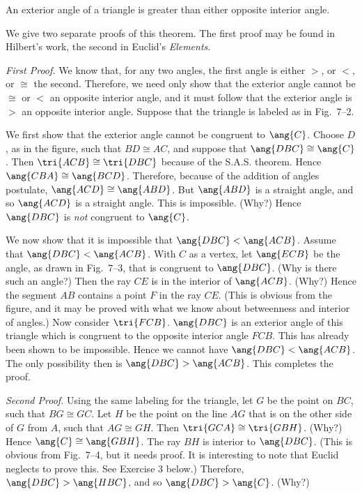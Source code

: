 \documentclass[11pt]{book}
\theoremstyle{bkplain}
\theoremstyle{XIplainnote}
\theoremstyle{bkplain}
\theoremstyle{bkplain}
\begin{document}
\begin{theorem}
An exterior angle of a triangle is greater than either opposite interior angle.
\end{theorem}

We give two separate proofs of this theorem. The first proof may be found in
Hilbert's work, the second in Euclid's \emph{Elements}.

\noindent\emph{First Proof.}\quad
We know that, for any two angles, the first angle is either $>$, or $<$, or
$\cong$ the second. Therefore, we need only show that the exterior angle
cannot be $\cong$ or $<$ an opposite interior angle, and it must follow that
the exterior angle is $>$ an opposite interior angle. Suppose that the triangle
is labeled as in Fig.~7--2.

\FIGVIITWOTHREE

We first show that the exterior angle cannot be congruent to $\ang{C}$. Choose
$D$, as in the figure, such that $BD \cong AC$, and suppose that
$\ang{DBC} \cong \ang{C}$. Then $\tri{ACB} \cong \tri{DBC}$ because of the
S.A.S. theorem. Hence $\ang{CBA} \cong \ang{BCD}$. Therefore, because of the
addition of angles postulate, $\ang{ACD} \cong \ang{ABD}$. But $\ang{ABD}$ is
a straight angle, and so $\ang{ACD}$ is a straight angle. This is impossible.
(Why?) Hence $\ang{DBC}$ is \emph{not} congruent to $\ang{C}$.

We now show that it is impossible that $\ang{DBC} < \ang{ACB}$. Assume that
$\ang{DBC} < \ang{ACB}$. With $C$ as a vertex, let $\ang{ECB}$ be the angle, as
drawn in Fig.~7--3, that is congruent to $\ang{DBC}$. (Why is there such an
angle?) Then the ray $CE$ is in the interior of $\ang{ACB}$. (Why?) Hence the
segment $AB$ contains a point $F$ in the ray $CE$. (This is obvious from the
figure, and it may be proved with what we know about betweenness and interior
of angles.) Now consider $\tri{FCB}$. $\ang{DBC}$ is an exterior angle of this
triangle which is congruent to the opposite interior angle $FCB$. This has
already been shown to be impossible. Hence we cannot have
$\ang{DBC} < \ang{ACB}$. The only possibility then is
$\ang{DBC} > \ang{ACB}$. This completes the proof.

\noindent\emph{Second Proof.}\quad
Using the same labeling for the triangle, let $G$ be the point on $BC$, such
that $BG \cong GC$. Let $H$ be the point on the line $AG$ that is on the other
side of $G$ from $A$, such that $AG \cong GH$. Then
$\tri{GCA} \cong \tri{GBH}$. (Why?) Hence $\ang{C} \cong \ang{GBH}$. The ray
$BH$ is interior to $\ang{DBC}$. (This is obvious from Fig.~7--4, but it needs
proof. It is interesting to note that Euclid neglects to prove this. See
Exercise 3 below.) Therefore, $\ang{DBC} > \ang{HBC}$, and so
$\ang{DBC} > \ang{C}$. (Why?)
\end{document}
